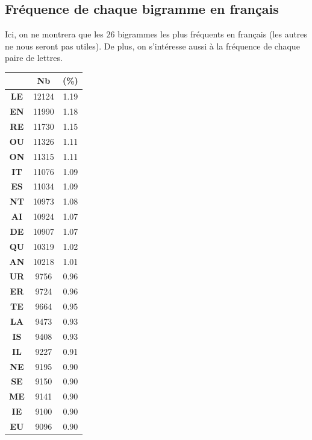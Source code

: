 \documentclass[a4paper, titlepage]{livret}
\begin{document}
\subsection{Fréquence de chaque bigramme en français}
Ici, on ne montrera que les $26$ bigrammes les plus fréquents en français (les autres ne nous seront pas utiles).
De plus, on s'intéresse aussi à la fréquence de chaque paire de lettres.\\

\begin{center}
\begin{minipage}[c]{.3\linewidth}
\begin{tabular}{|c|c|c|}
 \hline
	& \textbf{Nb} & \textbf{(\%)}\\
	\hline
 	\textbf{LE} &   12124 &  1.19\\
	\hline
	\textbf{EN} &   11990 &  1.18\\
	\hline
	\textbf{RE} &   11730 &  1.15\\
	\hline
	\textbf{OU} &   11326 &  1.11\\
	\hline
	\textbf{ON} &   11315 &  1.11\\
	\hline
	\textbf{IT} &   11076 &  1.09\\
	\hline
	\textbf{ES} &   11034 &  1.09\\
	\hline
	\textbf{NT} &   10973 &  1.08\\
	\hline
	\textbf{AI} &   10924 &  1.07\\
	\hline
	\textbf{DE} &   10907 &  1.07\\
	\hline
	\textbf{QU} &   10319 &  1.02\\
	\hline
	\textbf{AN} &   10218 &  1.01\\
	\hline
	\textbf{UR} &    9756 &  0.96\\
	\hline
	\textbf{ER} &    9724 &  0.96\\
	\hline
	\textbf{TE} &    9664 &  0.95\\
	\hline
	\textbf{LA} &    9473 &  0.93\\
	\hline
	\textbf{IS} &    9408 &  0.93\\
	\hline
	\textbf{IL} &    9227 &  0.91\\
	\hline
	\textbf{NE} &    9195 &  0.90\\
	\hline
	\textbf{SE} &    9150 &  0.90\\
	\hline
	\textbf{ME} &    9141 &  0.90\\
	\hline
	\textbf{IE} &    9100 &  0.90\\
	\hline
	\textbf{EU} &    9096 &  0.90\\

\end{tabular}
\end{minipage}
\end{center}
\end{document}
